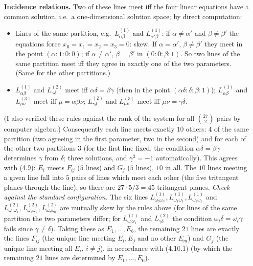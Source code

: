 \documentclass[11pt]{article}
\begin{document}
\textbf{Incidence relations.} Two of these lines meet iff the four linear equations have a common solution, i.e.\ a one-dimensional solution space; by direct computation:
\begin{itemize}
\item Lines of the same partition, e.g.\ $L^{(1)}_{\alpha\beta}$ and $L^{(1)}_{\alpha'\beta'}$: if $\alpha\ne\alpha'$ and $\beta\ne\beta'$ the equations force $x_0=x_1=x_2=x_3=0$: skew. If $\alpha=\alpha'$, $\beta\ne\beta'$ they meet in the point $(\alpha:1:0:0)$; if $\alpha\ne\alpha'$, $\beta=\beta'$ in $(0:0:\beta:1)$. So two lines of the same partition meet iff they agree in exactly one of the two parameters. (Same for the other partitions.)
\item $L^{(1)}_{\alpha\beta}$ and $L^{(2)}_{\gamma\delta}$ meet iff $\alpha\delta=\beta\gamma$ (then in the point $(\alpha\delta:\delta:\beta:1)$); $L^{(1)}_{\alpha\beta}$ and $L^{(3)}_{\mu\nu}$ meet iff $\mu=\alpha\beta\nu$; $L^{(2)}_{\gamma\delta}$ and $L^{(3)}_{\mu\nu}$ meet iff $\mu\nu=\gamma\delta$.
\end{itemize}
(I also verified these rules against the rank of the system for all $\binom{27}2$ pairs by computer algebra.) Consequently each line meets exactly $10$ others: $4$ of the same partition (two agreeing in the first parameter, two in the second) and for each of the other two partitions $3$ (for the first line fixed, the condition $\alpha\delta=\beta\gamma$ determines $\gamma$ from $\delta$; three solutions, and $\gamma^3=-1$ automatically). This agrees with (4.9): $E_i$ meets $F_{ij}$ ($5$ lines) and $G_j$ ($5$ lines), $10$ in all. The $10$ lines meeting a given line fall into $5$ pairs of lines which meet each other (the five tritangent planes through the line), so there are $27\cdot5/3=45$ tritangent planes. \emph{Check against the standard configuration.} The six lines $L^{(1)}_{\omega_0\omega_0},L^{(1)}_{\omega_1\omega_1},L^{(1)}_{\omega_2\omega_2}$ and $L^{(2)}_{\omega_0\omega_1},L^{(2)}_{\omega_1\omega_2},L^{(2)}_{\omega_2\omega_0}$ are mutually skew by the rules above (for lines of the same partition the two parameters differ; for $L^{(1)}_{\omega_i\omega_i}$ and $L^{(2)}_{\gamma\delta}$ the condition $\omega_i\delta=\omega_i\gamma$ fails since $\gamma\neq\delta$). Taking these as $E_1,\dots,E_6$, the remaining $21$ lines are exactly the lines $F_{ij}$ (the unique line meeting $E_i,E_j$ and no other $E_m$) and $G_j$ (the unique line meeting all $E_i$, $i\ne j$), in accordance with (4.10.1) (by which the remaining $21$ lines are determined by $E_1,\dots,E_6$).
\end{document}

